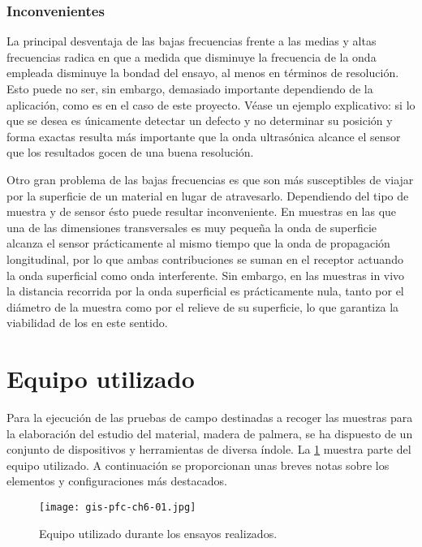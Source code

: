 \subsubsection{Inconvenientes}

La principal desventaja de las bajas frecuencias frente a las medias y
altas frecuencias radica en que a medida que disminuye la frecuencia de la
onda empleada disminuye la bondad del ensayo, al menos en términos de
resolución. Esto puede no ser, sin embargo, demasiado importante
dependiendo de la aplicación, como es en el caso de este proyecto. Véase un
ejemplo explicativo: si lo que se desea es únicamente detectar un defecto y
no determinar su posición y forma exactas resulta más importante que la
onda ultrasónica alcance el sensor que los resultados gocen de una buena
resolución.

Otro gran problema de las bajas frecuencias es que son más susceptibles de
viajar por la superficie de un material en lugar de atravesarlo.
Dependiendo del tipo de muestra y de sensor ésto puede resultar
inconveniente. En muestras en las que una de las dimensiones transversales
es muy pequeña la onda de superficie alcanza el sensor prácticamente al
mismo tiempo que la onda de propagación longitudinal, por lo que ambas
contribuciones se suman en el receptor actuando la onda superficial como
onda interferente. Sin embargo, en las muestras in vivo la distancia
recorrida por la onda superficial es prácticamente nula, tanto por el
diámetro de la muestra como por el relieve de su superficie, lo que
garantiza la viabilidad de los  en este sentido.


\section{Equipo utilizado}

Para la ejecución de las pruebas de campo destinadas a recoger las muestras
para la elaboración del estudio del material, madera de palmera, se ha
dispuesto de un conjunto de dispositivos y herramientas de diversa índole.
La \cref{fig:equipment} muestra parte del equipo utilizado. A continuación
se proporcionan unas breves notas sobre los elementos y configuraciones más
destacados.

\begin{figure}
    \begin{center}
	\texttt{[image: gis-pfc-ch6-01.jpg]}
    \end{center}
    \caption[Equipo utilizado durante los ensayos]{Equipo utilizado durante
    los ensayos realizados.}
    \label{fig:equipment}
\end{figure}


